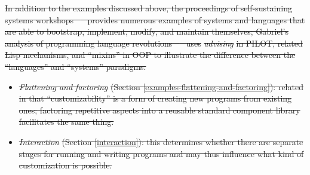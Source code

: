 \documentclass[english,submission]{programming}
\providecommand{\DIFdel}[1]{{\protect\color{red}\sout{#1}}}                      %
\begin{document}

\DIFdel{In addition to the examples discussed above, the proceedings of
self-sustaining systems workshops
\mbox{%
\cite{SelfSustaining2008,SelfSustaining2010} }\hspace{0pt}%
provides numerous examples
of systems and languages that are able to bootstrap, implement, modify,
and maintain themselves; Gabriel's analysis of programming language
revolutions \mbox{%
\cite{PLrev} }\hspace{0pt}%
uses }\emph{\DIFdel{advising}} %
\DIFdel{in PILOT, related Lisp
mechanisms, and ``mixins'' in OOP to illustrate the difference between
the ``languages'' and ``systems'' paradigms.
}%


\begin{itemize}%
\item%
\emph{\DIFdel{Flattening and factoring}} %
\DIFdel{(Section
  \ref{examples-flattening-and-factoring}): related in that
  ``customizability'' is a form of creating new programs from existing
  ones; factoring repetitive aspects into a reusable standard component
  library facilitates the same thing.
}%
\item%
\emph{\DIFdel{Interaction}} %
\DIFdel{(Section \ref{interaction}): this determines
  whether there are separate stages for running and writing programs and
  may thus influence what kind of customization is possible.
}
\end{itemize}%

\end{document}

